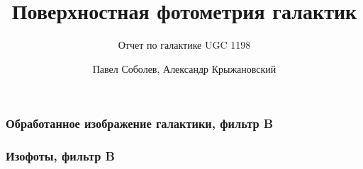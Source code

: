 \documentclass[aspectratio=169, hyperref={bookmarks=false}]{beamer}
\title{Поверхностная фотометрия галактик}
\subtitle{Отчет по галактике UGC 1198}
\author{Павел Соболев, Александр Крыжановский}
\date{}
\begin{document}
\frame{\titlepage}

\begin{frame}
\frametitle{Обработанное изображение галактики, фильтр B}

    \begin{minipage}[h]{\linewidth} 
    \end{minipage}

\end{frame}

\begin{frame}
\frametitle{Изофоты, фильтр B}

    \begin{minipage}[h]{0.9\linewidth} 
    \end{minipage}

\end{frame}
\end{document}
